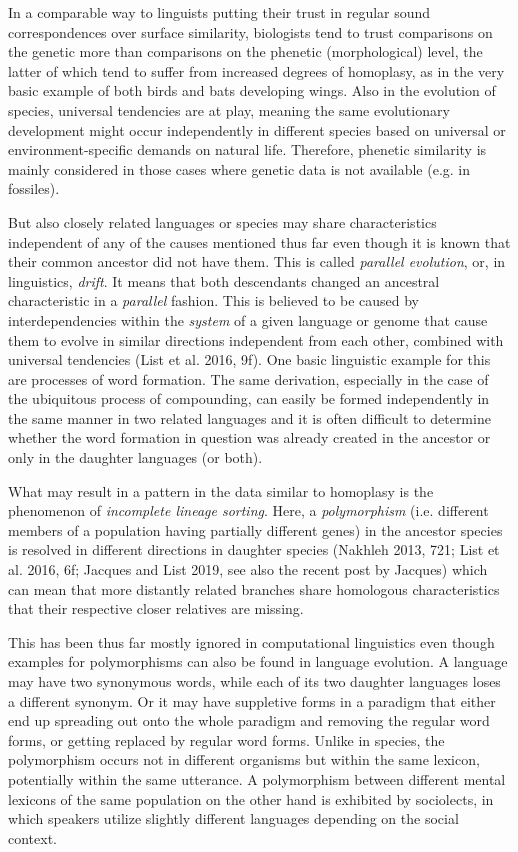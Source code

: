\documentclass[
  a4paper,
  14pt,
  oneside,
  tablecaptionabove
]{scrbook}
\begin{document}
In a comparable way to linguists putting their trust in regular sound correspondences over surface similarity, biologists tend to trust comparisons on the genetic more than comparisons on the phenetic (morphological) level, the latter of which tend to suffer from increased degrees of homoplasy, as in the very basic example of both birds and bats developing wings. Also in the evolution of species, universal tendencies are at play, meaning the same evolutionary development might occur independently in different species based on universal or environment-specific demands on natural life. Therefore, phenetic similarity is mainly considered in those cases where genetic data is not available (e.g. in fossiles).

But also closely related languages or species may share characteristics 
independent of any of the causes mentioned thus far even though it is known 
that their common ancestor did not have them. This is called \emph{parallel 
evolution}, or, in linguistics, \emph{drift}. It means that both descendants changed 
an ancestral characteristic in a \emph{parallel} fashion. This is believed to be 
caused by interdependencies within the \emph{system} of a given language or genome 
that cause them to evolve in similar directions independent from each other, 
combined with universal tendencies (List et al. 2016, 9f). One basic 
linguistic example for this are processes of word formation. The same 
derivation, especially in the case of the ubiquitous process of compounding, 
can easily be formed independently in the same manner in two related languages 
and it is often difficult to determine whether the word formation in 
question was already created in the ancestor or only in the daughter 
languages (or both).



What may result in a pattern in the data similar to homoplasy is the 
phenomenon of \emph{incomplete lineage sorting}. Here, a \emph{polymorphism} (i.e. 
different members of a population having partially different genes) in the 
ancestor species is resolved in different directions in daughter species 
(Nakhleh 2013, 721; List et al. 2016, 6f; Jacques and List 2019, see also 
the recent post by Jacques) which can mean that more distantly related 
branches share homologous characteristics that their respective closer 
relatives are missing.



This has been thus far mostly ignored in computational linguistics even though examples for polymorphisms can also be found in language evolution. A language may have two synonymous words, while each of its two daughter languages loses a different synonym. Or it may have suppletive forms in a paradigm that either end up spreading out onto the whole paradigm and removing the regular word forms, or getting replaced by regular word forms. Unlike in species, the polymorphism occurs not in different organisms but within the same lexicon, potentially within the same utterance. A polymorphism between different mental lexicons of the same population on the other hand is exhibited by sociolects, in which speakers utilize slightly different languages depending on the social context.
\end{document}
